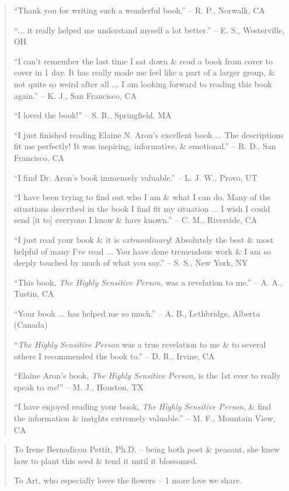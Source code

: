\documentclass{article}
\numberwithin{equation}{section}
\begin{document}
\begin{quotation}
	``Thank you for writing such a wonderful book.'' -- R. P., Norwalk, CA
	
	``$\ldots$ it really helped me understand myself a lot better.'' -- E. S., Westerville, OH
	
	``I can't remember the last time I sat down \& read a book from cover to cover in 1 day. It has really made me feel like a part of a larger group, \& not quite so weird after all $\ldots$ I am looking forward to reading this book again.'' -- K. J., San Francisco, CA
	
	``I loved the book!'' -- S. R., Springfield, MA
	
	``I just finished reading Elaine N. Aron's excellent book $\ldots$ The descriptions fit me perfectly! It was inspiring, informative, \& emotional.'' -- R. D., San Francisco, CA
	
	``I find Dr. Aron's book immensely valuable.'' -- L. J. W., Provo, UT
	
	``I have been trying to find out who I am \& what I can do. Many of the situations described in the book I find fit my situation $\ldots$ I wish I could send [it to] everyone I know \& have known.'' -- C. M., Riverside, CA
	
	``I just read your book \& it is \textit{extraordinary}! Absolutely the best \& most helpful of many I've read $\ldots$ You have done tremendous work \& I am so deeply touched by much of what you say.'' -- S. S., New York, NY
	
	``This book, \textit{The Highly Sensitive Person}, was a revelation to me.'' -- A. A., Tustin, CA
	
	``Your book $\ldots$ has helped me so much.'' -- A. B., Lethbridge, Alberta (Canada)
	
	``\textit{The Highly Sensitive Person} was a true revelation to me \& to several others I recommended the book to.'' -- D. R., Irvine, CA
	
	``Elaine Aron's book, \textit{The Highly Sensitive Person}, is the 1st ever to really speak to \textit{me}!'' -- M. J., Houston, TX
	
	``I have enjoyed reading your book, \textit{The Highly Sensitive Person}, \& find the information \& insights extremely valuable.'' -- M. F., Mountain View, CA
\end{quotation}

\begin{quotation}
	To Irene Bernadicou Pettit, Ph.D. -- being both poet \& peasant, she knew how to plant this seed \& tend it until it blossomed.
	
	To Art, who especially loves the flowers -- 1 more love we share.
\end{quotation}
\end{document}
